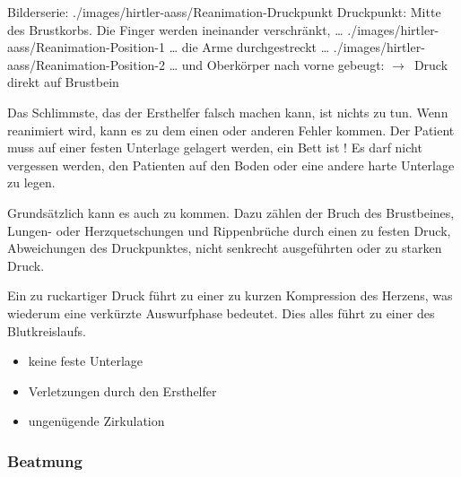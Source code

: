 \begin{PictureSeriesWide}{}{Bilderserie:  }
{./images/hirtler-aass/Reanimation-Druckpunkt}
{Druckpunkt: Mitte des Brustkorbs. Die Finger werden
ineinander verschränkt, \ldots}
{./images/hirtler-aass/Reanimation-Position-1}
{{\ldots} die Arme durchgestreckt \ldots}
{./images/hirtler-aass/Reanimation-Position-2}
{{\ldots} und Oberkörper nach vorne gebeugt:
$\rightarrow$~Druck direkt auf Brustbein}
{}
{}
\end{PictureSeriesWide}

{Das Schlimmste, das der Ersthelfer falsch machen kann, ist
 nichts zu tun. Wenn reanimiert wird, kann es zu dem einen
 oder anderen Fehler kommen. Der Patient muss auf einer
 festen Unterlage gelagert werden, ein Bett ist ! Es darf nicht vergessen werden, den
 Patienten auf den Boden oder eine andere harte Unterlage zu
 legen.

Grundsätzlich kann es auch zu  kommen. Dazu zählen der Bruch des Brustbeines,
Lungen- oder Herzquetschungen und Rippenbrüche durch einen
zu festen Druck, Abweichungen des Druckpunktes, nicht
senkrecht ausgeführten oder zu starken Druck.

Ein zu ruckartiger Druck führt zu einer zu kurzen
Kompression des Herzens, was wiederum eine verkürzte
Auswurfphase bedeutet. Dies alles führt zu einer
 des Blutkreislaufs.

}{
\begin{itemize}
  \item keine feste Unterlage
  \item Verletzungen durch den Ersthelfer
  \item ungenügende Zirkulation
\end{itemize}
}{}{}{}

\subsubsection{Beatmung}

